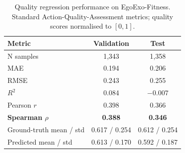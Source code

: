 \documentclass[conference,onecolumn,oneside]{IEEEtran}
\begin{document}
\begin{table}[H]
\centering
\caption{Quality regression performance on EgoExo-Fitness. Standard
Action-Quality-Assessment metrics; quality scores normalised to $[0, 1]$.}
\label{tab:multitask_quality}
\small
\renewcommand{\arraystretch}{1.20}
\begin{tabular}{|l|c|c|}
\hline
\textbf{Metric} & \textbf{Validation} & \textbf{Test} \\
\hline
N samples            & 1{,}343         & 1{,}358 \\
MAE                  & 0.194           & 0.206 \\
RMSE                 & 0.243           & 0.255 \\
$R^2$                & 0.084           & $-0.007$ \\
Pearson $r$          & 0.398           & 0.366 \\
\textbf{Spearman $\rho$} & \textbf{0.388} & \textbf{0.346} \\
\hline
Ground-truth mean / std & 0.617 / 0.254 & 0.612 / 0.254 \\
Predicted mean / std    & 0.613 / 0.170 & 0.592 / 0.187 \\
\hline
\end{tabular}
\end{table}
\end{document}
